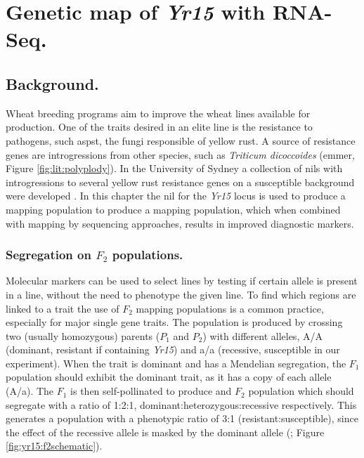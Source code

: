 
\chapter{Genetic map of \textit{Yr15} with RNA-Seq.}
\glsresetall
{}
\label{yr15}
 
\section{Background.}
Wheat breeding programs aim to improve the wheat lines available for production.
One of the traits desired in an elite line is the resistance to pathogens, such as\gls{pst}, the fungi responsible of yellow rust.
A source of resistance genes are introgressions from other species, such as \textit{Triticum dicoccoides} (emmer, Figure \ref{fig:lit:polyplody}). 
In the University of Sydney a collection of \glspl{nil} with introgressions to several yellow rust resistance genes on a susceptible background were developed \citep{Wellings1998}. 
In this chapter the \gls{nil} for the \textit{Yr15} locus is used to produce a mapping population to produce a mapping population, which when combined with mapping by sequencing approaches, results in improved diagnostic markers. 

\subsection{Segregation on \texorpdfstring{$F_{2}$}{F2} populations.}
\label{yr15:f2}
Molecular markers can be used to select lines by testing if certain allele is present in a line, without the need to phenotype  the given line.
To find which regions are linked to a trait the use of $F_{2}$ mapping populations is a common practice, especially for major single gene traits.
The population is produced by crossing two (usually homozygous) parents ($P_1$ and $P_{2}$) with different alleles, A/A (dominant, resistant if containing \textit{Yr15}) and a/a (recessive, susceptible in our experiment).
When the trait is dominant and has a Mendelian segregation, the $F_1$ population should exhibit the dominant trait, as it has a copy of each allele (A/a). 
The $F_1$ is then self-pollinated to produce and $F_2$ population which should segregate with a ratio of 1:2:1, dominant:heterozygous:recessive respectively.
This generates a population with a phenotypic ratio of 3:1 (resistant:susceptible), since the effect of the recessive allele is masked by the dominant allele (\citealt{VanOoijen2013}; Figure \ref{fig:yr15:f2schematic}).  

